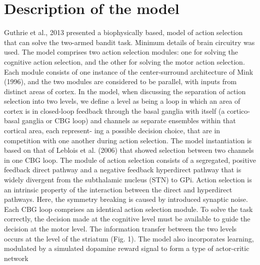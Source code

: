 \section{Description of the model}

Guthrie et al., 2013 presented a biophysically based, model of action selection that can solve the two-armed bandit task. Minimum details of brain circuitry was used. The model comprises two action selection modules: one for solving the cognitive action selection, and the other for solving the motor action selection. Each module consists of one instance of the center-surround architecture of Mink (1996), and the two modules are considered to be parallel, with inputs from distinct areas of cortex. In the model, when discussing the separation of action selection into two levels, we define a level as being a loop in which an area of cortex is in closed-loop feedback through the basal ganglia with itself (a cortico-basal ganglia or CBG loop) and channels as separate ensembles within that cortical area, each represent- ing a possible decision choice, that are in competition with one another during action selection.
The model instantiation is based on that of Leblois et al. (2006) that showed selection between two channels in one CBG loop. The module of action selection consists of a segregated, positive feedback direct pathway and a negative feedback hyperdirect pathway that is widely divergent from the subthalamic nucleus (STN) to GPi. Action selection is an intrinsic property of the interaction between the direct and hyperdirect pathways.
Here, the symmetry breaking is caused by introduced synaptic noise. Each CBG loop comprises an identical action selection module. To solve the task correctly, the decision made at the cognitive level must be available to guide the decision at the motor level. The information transfer between the two levels occurs at the level of the striatum (Fig. 1). The model also incorporates learning, modulated by a simulated dopamine reward signal to form a type of actor-critic network

